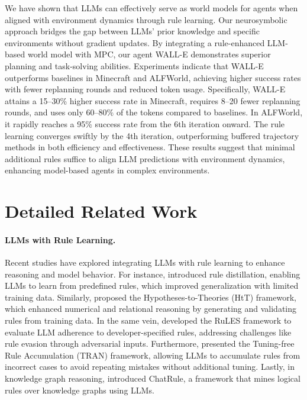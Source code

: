 \documentclass{article} %
\begin{document}
We have shown that LLMs can effectively serve as world models for agents when aligned with environment dynamics through rule learning. Our neurosymbolic approach bridges the gap between LLMs' prior knowledge and specific environments without gradient updates. By integrating a rule-enhanced LLM-based world model with MPC, our agent WALL-E demonstrates superior planning and task-solving abilities. Experiments indicate that WALL-E outperforms baselines in Minecraft and ALFWorld, achieving higher success rates with fewer replanning rounds and reduced token usage. Specifically, WALL-E attains a 15–30\% higher success rate in Minecraft, requires 8–20 fewer replanning rounds, and uses only 60–80\% of the tokens compared to baselines. In ALFWorld, it rapidly reaches a 95\% success rate from the 6th iteration onward. The rule learning converges swiftly by the 4th iteration, outperforming buffered trajectory methods in both efficiency and effectiveness. These results suggest that minimal additional rules suffice to align LLM predictions with environment dynamics, enhancing model-based agents in complex environments.



















\appendix


\newpage



\section{Detailed Related Work} 
\label{sec:Detailed Related Work}

\paragraph{LLMs with Rule Learning.}
Recent studies have explored integrating LLMs with rule learning to enhance reasoning and model behavior. For instance, \cite{yang2023enabling} introduced rule distillation, enabling LLMs to learn from predefined rules, which improved generalization with limited training data. Similarly, \cite{Zhu2023Large} proposed the Hypotheses-to-Theories (HtT) framework, which enhanced numerical and relational reasoning by generating and validating rules from training data. In the same vein, \cite{mu2023can} developed the RuLES framework to evaluate LLM adherence to developer-specified rules, addressing challenges like rule evasion through adversarial inputs. Furthermore, \cite{yang2023failures} presented the Tuning-free Rule Accumulation (TRAN) framework, allowing LLMs to accumulate rules from incorrect cases to avoid repeating mistakes without additional tuning. Lastly, in knowledge graph reasoning, \cite{luo2023chatrule} introduced ChatRule, a framework that mines logical rules over knowledge graphs using LLMs.
\end{document}
